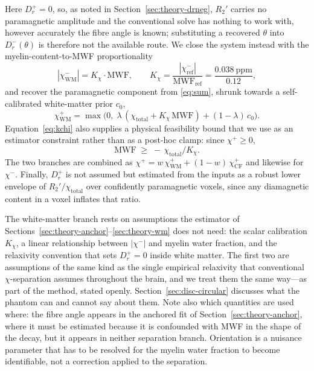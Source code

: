 \documentclass[AMA,STIX2COL,Linenumberson]{MRM}
\begin{document}
Here $D_r^{+}=0$, so, as noted in Section~\ref{sec:theory-drneg}, $R_2'$ carries no paramagnetic amplitude and the conventional solve has nothing to work with, however accurately the fibre angle is known; substituting a recovered $\theta$ into $D_r^{-}(\theta)$ is therefore not the available route. We close the system instead with the myelin-content-to-MWF proportionality
\begin{equation}
|\chi^{-}_{\mathrm{WM}}| = K_\chi \cdot \mathrm{MWF}, \qquad
K_\chi = \frac{|\chi^{-}_{\mathrm{ref}}|}{\mathrm{MWF}_{\mathrm{ref}}} = \frac{0.038~\mathrm{ppm}}{0.12},
\label{eq:kchi}
\end{equation}
and recover the paramagnetic component from \eqref{eq:sum}, shrunk towards a self-calibrated white-matter prior $c_0$,
\begin{equation}
\chi^{+}_{\mathrm{WM}} = \max\!\big(0,\; \lambda\,(\chi_{\mathrm{total}} + K_\chi\,\mathrm{MWF}) + (1-\lambda)\,c_0 \big).
\label{eq:wmpos}
\end{equation}
Equation~\eqref{eq:kchi} also supplies a physical feasibility bound that we use as an estimator constraint rather than as a post-hoc clamp: since $\chi^{+}\ge0$,
\begin{equation}
\mathrm{MWF} \;\ge\; -\,\chi_{\mathrm{total}}/K_\chi .
\label{eq:mwfbound}
\end{equation}
The two branches are combined as $\chi^{+} = w\,\chi^{+}_{\mathrm{WM}} + (1-w)\,\chi^{+}_{\mathrm{CF}}$ and likewise for $\chi^{-}$. Finally, $D_r^{+}$ is not assumed but estimated from the inputs as a robust lower envelope of $R_2'/\chi_{\mathrm{total}}$ over confidently paramagnetic voxels, since any diamagnetic content in a voxel inflates that ratio.

The white-matter branch rests on assumptions the estimator of Sections~\ref{sec:theory-anchor}--\ref{sec:theory-wm} does not need: the scalar calibration $K_\chi$, a linear relationship between $|\chi^{-}|$ and myelin water fraction, and the relaxivity convention that sets $D_r^{+}=0$ inside white matter. The first two are assumptions of the same kind as the single empirical relaxivity that conventional $\chi$-separation assumes throughout the brain, and we treat them the same way---as part of the method, stated openly. Section~\ref{sec:disc-circular} discusses what the phantom can and cannot say about them. Note also which quantities are used where: the fibre angle appears in the anchored fit of Section~\ref{sec:theory-anchor}, where it must be estimated because it is confounded with MWF in the shape of the decay, but it appears in neither separation branch. Orientation is a nuisance parameter that has to be resolved for the myelin water fraction to become identifiable, not a correction applied to the separation.
\end{document}
